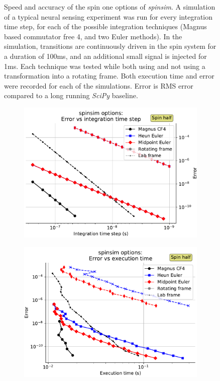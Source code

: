 \documentclass{jors}
\begin{document}
\begin{figure}[h!]
			\caption{Speed and accuracy of the spin one options of \emph{spinsim}.
			A simulation of a typical neural sensing experiment was run for every integration time step, for each of the possible integration techniques (Magnus based commutator free 4, and two Euler methods).
			In the simulation, transitions are continuously driven in the spin system for a duration of 100ms, and an additional small signal is injected for 1ms.
			Each technique was tested while both using and not using a transformation into a rotating frame.
			Both execution time and error were recorded for each of the simulations.
			Error is RMS error compared to a long running \emph{SciPy} baseline.}
			\label{fig:benchmark_spin_one}
		\end{figure}

		\begin{figure}[h!]
			\begin{subfigure}[b]{0.475\textwidth}
				\includegraphics[scale=0.475]{benchmark_spin_half_step_error.pdf}
				\caption{}
				\label{fig:benchmark_spin_half_step_error}
			\end{subfigure}
			\hfill
			\begin{subfigure}[b]{0.475\textwidth}
				\includegraphics[scale=0.475]{benchmark_spin_half_execution_error.pdf}

\end{subfigure}
\end{figure}
\end{document}

